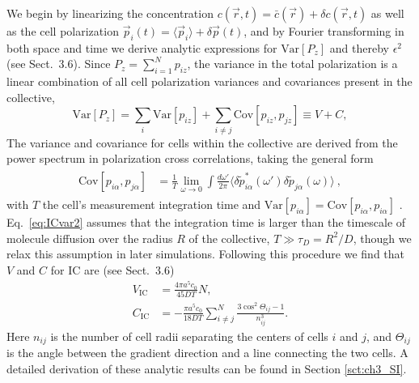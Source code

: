We begin by linearizing the concentration $c(\vec{r},t) = \bar{c}(\vec{r}) + \delta c(\vec{r},t)$ as well as the cell polarization
$\vec{p}_i(t) = \langle \vec{p}_i \rangle + \delta\vec{p}(t)$,
and by Fourier transforming in both space and time we derive analytic expressions for
$\text{Var}[P_z]$ and thereby $\epsilon^2$ (see Sect.\ 3.6). Since
$P_z = \sum_{i=1}^N p_{iz}$,
the variance in the total polarization is a linear combination of all cell polarization variances and covariances present in the collective,
\begin{equation} \label{eq:ICvar1}
    \text{Var}[P_z] =
    \sum_{i} \text{Var}[p_{iz}]
    + \sum_{i\neq j} \text{Cov}[p_{iz},p_{jz}]
    \equiv V + C ,
\end{equation}
The variance and covariance for cells within the collective are derived from the power spectrum in polarization cross correlations, taking the general form
\begin{align} \label{eq:ICvar2}
\begin{split}
    \text{Cov}[p_{i\alpha},p_{j\alpha}] &= \frac{1}{T}
    \lim_{\omega \to 0} \int \frac{d\omega'}{2\pi}
    \langle\delta\tilde{p}_{i\alpha}^*(\omega')\delta\tilde{p}_{j\alpha}(\omega) \rangle
    \ ,
\end{split}
\end{align}
with $T$ the cell's measurement integration time and $\text{Var}[p_{i\alpha}] = \text{Cov}[p_{i\alpha},p_{i\alpha}]$ \cite{fancher2016fundamental,mugler2016limits,bialek2005physical}. Eq.\ \ref{eq:ICvar2} assumes that the integration time is larger than the timescale of molecule diffusion over the radius $R$ of the collective,
$T \gg \tau_D = R^2/D$, though we relax this assumption in later simulations.
Following this procedure we find that $V$ and $C$ for IC are (see Sect.\ 3.6)
\begin{align}
    V_\text{IC} &= \frac{4\pi a^5c_0}{45DT} N  \label{eq:ICV} , \\
    C_\text{IC} &= -\frac{\pi a^5c_0}{18DT} \sum_{i \neq j}^N \frac{3\cos^2\Theta_{ij}-1}{n^3_{ij}} . \label{eq:ICC}
\end{align}
Here
$n_{ij}$
is the number of cell radii separating the centers of cells $i$ and $j$, and $\Theta_{ij}$ is the angle between the gradient direction and a line connecting the two cells. A detailed derivation of these analytic results can be found in Section \ref{sct:ch3_SI}.

